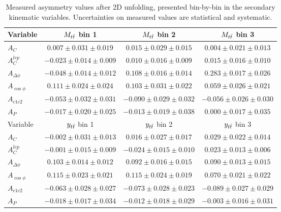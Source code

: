 \begin{table}[hbt]
\begin{center}
\caption{Measured asymmetry values after 2D unfolding, presented
  bin-by-bin in the secondary kinematic variables. Uncertainties on
  measured values are statistical and systematic.}
\label{tab:afb:results2d:binbybin}
\begin{tabular}{l |  c  c  c }
\hline
Variable & $M_{t\bar{t}}$ bin 1 & $M_{t\bar{t}}$ bin 2 & $M_{t\bar{t}}$ bin 3  \\ \hline
$A_{C}$  & $0.007 \pm 0.031 \pm 0.019$   & $0.015 \pm 0.029 \pm 0.015$   & $0.004 \pm 0.021 \pm 0.013$  \\
$A^{lep}_{C}$  & $-0.023 \pm 0.014 \pm 0.009$   & $0.010 \pm 0.016 \pm 0.009$   & $0.015 \pm 0.016 \pm 0.010$  \\
$A_{\Delta\phi}$  & $-0.048 \pm 0.014 \pm 0.012$   & $0.108 \pm 0.016 \pm 0.014$   & $0.283 \pm 0.017 \pm 0.026$  \\
$A_{\cos\phi}$  & $0.111 \pm 0.024 \pm 0.024$   & $0.103 \pm 0.031 \pm 0.022$   & $0.059 \pm 0.026 \pm 0.021$  \\
$A_{c1c2}$  & $-0.053 \pm 0.032 \pm 0.031$   & $-0.090 \pm 0.029 \pm 0.032$   & $-0.056 \pm 0.026 \pm 0.030$  \\
$A_{P}$  & $-0.017 \pm 0.020 \pm 0.025$   & $-0.013 \pm 0.019 \pm 0.038$   & $0.000 \pm 0.017 \pm 0.035$  \\
 \hline

\hline
Variable & $y_{t\bar{t}}$ bin 1 & $y_{t\bar{t}}$ bin 2 & $y_{t\bar{t}}$ bin 3  \\ \hline
$A_{C}$  & $-0.002 \pm 0.031 \pm 0.013$   & $0.016 \pm 0.027 \pm 0.017$   & $0.029 \pm 0.022 \pm 0.014$  \\
$A^{lep}_{C}$  & $-0.001 \pm 0.015 \pm 0.009$   & $-0.024 \pm 0.015 \pm 0.010$   & $0.023 \pm 0.013 \pm 0.006$  \\
$A_{\Delta\phi}$  & $0.103 \pm 0.014 \pm 0.012$   & $0.092 \pm 0.016 \pm 0.015$   & $0.090 \pm 0.013 \pm 0.015$  \\
$A_{\cos\phi}$  & $0.115 \pm 0.023 \pm 0.021$   & $0.115 \pm 0.024 \pm 0.019$   & $0.070 \pm 0.021 \pm 0.022$  \\
$A_{c1c2}$  & $-0.063 \pm 0.028 \pm 0.027$   & $-0.073 \pm 0.028 \pm 0.023$   & $-0.089 \pm 0.027 \pm 0.029$  \\
$A_{P}$  & $-0.018 \pm 0.017 \pm 0.034$   & $-0.012 \pm 0.018 \pm 0.029$   & $-0.003 \pm 0.016 \pm 0.031$  \\
 \hline


\end{tabular}
\end{center}
\end{table}
